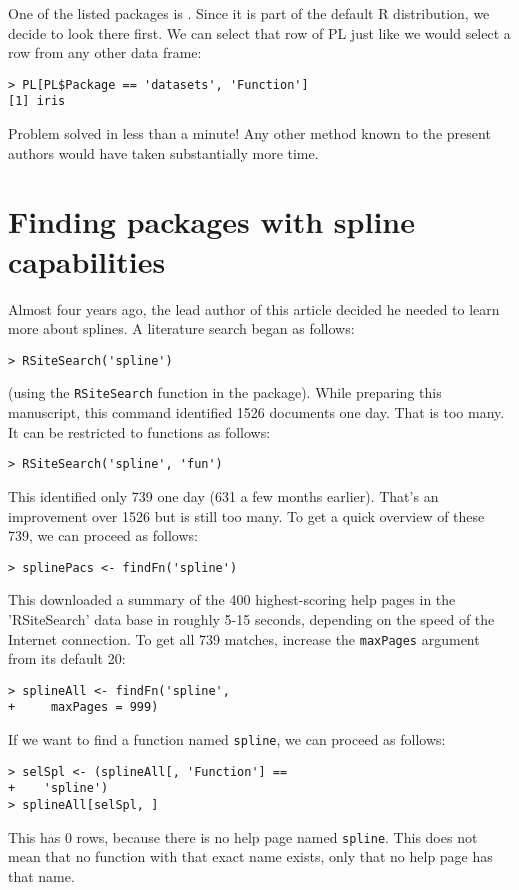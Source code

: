 One of the listed packages is .  Since it is part of the
default R distribution, we decide to look there first.  We can
select that row of PL just like we would select a row from any other
data frame:
\begin{verbatim}
> PL[PL$Package == 'datasets', 'Function']
[1] iris
\end{verbatim}
Problem solved in less than a minute!  Any other method known
to the present authors would have taken substantially more time.

\section{Finding packages with spline capabilities}

Almost four years ago, the lead author of this article decided he
needed to learn more about splines.  A literature search
began as follows:
\begin{verbatim}
> RSiteSearch('spline')
\end{verbatim}
(using the {\tt RSiteSearch} function in the  package).
While preparing this manuscript, this command identified
1526 documents one day.  That is too many.  It can be
restricted to functions as follows:
\begin{verbatim}
> RSiteSearch('spline', 'fun')
\end{verbatim}
This identified only 739 one day (631 a few months earlier).
That's an improvement over 1526 but is still too many.
To get a quick overview of these 739, we can proceed
as follows:
\begin{verbatim}
> splinePacs <- findFn('spline')
\end{verbatim}
This downloaded a summary of the 400 highest-scoring help pages
in the 'RSiteSearch' data base in roughly 5-15 seconds, depending
on the speed of the Internet connection.  To get all 739 matches,
increase the {\tt maxPages} argument from its default 20:
\begin{verbatim}
> splineAll <- findFn('spline',
+     maxPages = 999)
\end{verbatim}

If we want to find a function named {\tt spline}, we can
proceed as follows:
\begin{verbatim}
> selSpl <- (splineAll[, 'Function'] ==
+    'spline')
> splineAll[selSpl, ]
\end{verbatim}
This has 0 rows, because there is no help page named
{\tt spline}.  This does not mean that no function
with that exact name exists, only that no help page
has that name.

